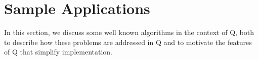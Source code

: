 \section{Sample Applications}
\label{sample_apps}

In this section, we discuss some well known algorithms in the context of Q, both
to describe how these problems are addressed in Q and to motivate the features
of Q that simplify implementation.





